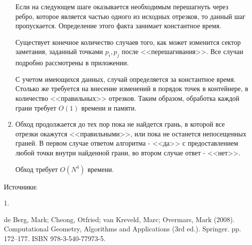 \documentclass[letterpaper,12pt]{article}
\begin{document}
\begin{enumerate}
            \par
            Если на следующем шаге оказывается необходимым перешагнуть через
            ребро, которое является частью одного из исходных отрезков, то
            данный шаг пропускается. Определение этого факта занимает 
            константное время.
            \par
            Существует конечное количество случаев того, как может изменится
            сектор заметания, заданный точками $p_i, p_j$ после <<перешагивания>>.
            Все случаи подробно рассмотрены в приложении.
            \par
            С учетом имеющихся данных, случай определяется за 
            константное время. Столько же требуется на внесение изменений 
            в порядок точек в контейнере, в количество <<правильных>>
            отрезков.       
            Таким образом, обработка каждой грани требует $O(1)$ времени и памяти. 
      \item Обход продолжается до тех пор пока не найдется грань, 
            в которой все отрезки окажутся <<правильными>>, или пока не
            останется непосещенных граней. В первом случае ответом 
            алгоритма - <<да>> с предоставлением любой точки внутри 
            найденной грани, во втором случае ответ - <<нет>>.
            \par
            Обход требует $O(N^4)$ времени.
\end{enumerate}
\par
Источники:
\par
\hypertarget{literature_1}{1.} de Berg, Mark; Cheong, Otfried; van Kreveld, Marc; Overmars, Mark (2008). 
Computational Geometry, Algorithms and Applications (3rd ed.). 
Springer. pp. 172–177. ISBN 978-3-540-77973-5.
\end{document}
